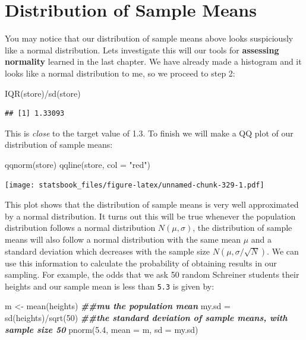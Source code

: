 \documentclass[
]{book}
\newenvironment{Shaded}{\begin{snugshade}}{\end{snugshade}}
\newcommand{\AttributeTok}[1]{\textcolor[rgb]{0.77,0.63,0.00}{#1}}
\newcommand{\DecValTok}[1]{\textcolor[rgb]{0.00,0.00,0.81}{#1}}
\newcommand{\DocumentationTok}[1]{\textcolor[rgb]{0.56,0.35,0.01}{\textbf{\textit{#1}}}}
\newcommand{\FloatTok}[1]{\textcolor[rgb]{0.00,0.00,0.81}{#1}}
\newcommand{\FunctionTok}[1]{\textcolor[rgb]{0.00,0.00,0.00}{#1}}
\newcommand{\NormalTok}[1]{#1}
\newcommand{\OtherTok}[1]{\textcolor[rgb]{0.56,0.35,0.01}{#1}}
\newcommand{\SpecialCharTok}[1]{\textcolor[rgb]{0.00,0.00,0.00}{#1}}
\newcommand{\StringTok}[1]{\textcolor[rgb]{0.31,0.60,0.02}{#1}}
\theoremstyle{definition}
\theoremstyle{definition}
\theoremstyle{definition}
\theoremstyle{definition}
\theoremstyle{remark}
\begin{document}
\hypertarget{distribution-of-sample-means}{%
\section{Distribution of Sample Means}\label{distribution-of-sample-means}}

You may notice that our distribution of sample means above looks suspiciously like a normal distribution. Lets investigate this will our tools for \textbf{assessing normality} learned in the last chapter. We have already made a histogram and it looks like a normal distribution to me, so we proceed to step 2:

\begin{Shaded}
\begin{Highlighting}[]
\FunctionTok{IQR}\NormalTok{(store)}\SpecialCharTok{/}\FunctionTok{sd}\NormalTok{(store)}
\end{Highlighting}
\end{Shaded}

\begin{verbatim}
## [1] 1.33093
\end{verbatim}

This is \emph{close} to the target value of 1.3. To finish we will make a QQ plot of our distribution of sample means:

\begin{Shaded}
\begin{Highlighting}[]
\FunctionTok{qqnorm}\NormalTok{(store)}
\FunctionTok{qqline}\NormalTok{(store, }\AttributeTok{col =} \StringTok{"red"}\NormalTok{)}
\end{Highlighting}
\end{Shaded}

\texttt{[image: statsbook\_files/figure-latex/unnamed-chunk-329-1.pdf]}

This plot shows that the distribution of sample means is very well approximated by a normal distribution. It turns out this will be true whenever the population distribution follows a normal distribution \(N(\mu, \sigma)\), the distribution of sample means will also follow a normal distribution with the same mean \(\mu\) and a standard deviation which decreases with the sample size \(N(\mu, \sigma/\sqrt{N})\). We can use this information to calculate the probability of obtaining results in our sampling. For example, the odds that we ask 50 random Schreiner students their heights and our sample mean is less than \texttt{5.3} is given by:

\begin{Shaded}
\begin{Highlighting}[]
\NormalTok{m }\OtherTok{\textless{}{-}} \FunctionTok{mean}\NormalTok{(heights)  }\DocumentationTok{\#\#mu the population mean}
\NormalTok{my.sd }\OtherTok{=} \FunctionTok{sd}\NormalTok{(heights)}\SpecialCharTok{/}\FunctionTok{sqrt}\NormalTok{(}\DecValTok{50}\NormalTok{)  }\DocumentationTok{\#\#the standard deviation of sample means, with sample size 50}
\FunctionTok{pnorm}\NormalTok{(}\FloatTok{5.4}\NormalTok{, }\AttributeTok{mean =}\NormalTok{ m, }\AttributeTok{sd =}\NormalTok{ my.sd)}
\end{Highlighting}
\end{Shaded}
\end{document}
